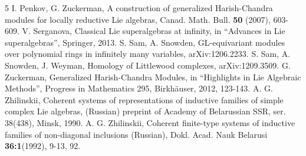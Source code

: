 \documentclass[10pt]{amsart}
\begin{document}
\begin{thebibliography}{5}
\vspace{0.2cm}
 I. Penkov, G. Zuckerman, A construction of generalized Harish-Chandra modules for locally reductive Lie algebras, Canad. Math. Bull. \textbf{50} (2007), 603-609.
\vspace{0.2cm}
 V. Serganova, Classical Lie superalgebras at infinity, in ``Advances in Lie superalgebras'',
Springer, 2013.
\vspace{0.2cm}
 S. Sam, A. Snowden, GL-equivariant modules over polynomial rings in infinitely many variables, arXiv:1206.2233.
\vspace{0.2cm}
 S. Sam, A. Snowden, J. Weyman, Homology of Littlewood complexes, arXiv:1209.3509.
\vspace{0.2cm}
 G. Zuckerman, Generalized Harish-Chandra Modules, in ``Highlights in Lie Algebraic Methods'', Progress in Mathematics 295, Birkh\"{a}user, 2012, 123-143.
\vspace{0.2cm}
 A. G. Zhilinskii, Coherent systems of representations of inductive families of simple complex Lie algebras, (Russian) preprint of Academy of Belarussian SSR, ser. 38(438), Minsk, 1990.
\vspace{0.2cm}
 A. G. Zhilinskii, Coherent finite-type systems of inductive families of non-diagonal inclusions (Russian), Dokl. Acad. Nauk Belarusi \textbf{36:1}(1992), 9-13, 92.
\end{thebibliography}
\end{document}
